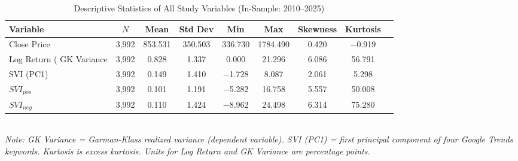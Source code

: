 \begin{table}[H]
\centering
\caption{Descriptive Statistics of All Study Variables (In-Sample: 2010--2025)}
\label{tab:descriptive}
\small
\begin{tabular}{lcccccccc}
\toprule
Variable & $N$ & Mean & Std Dev & Min & Max & Skewness & Kurtosis \\
\midrule
        Close Price & 3,992 & 853.531 & 350.503 & 336.730 & 1784.490 & 0.420 & $-$0.919 \\
        Log Return (%
        GK Variance & 3,992 & 0.828 & 1.337 & 0.000 & 21.296 & 6.086 & 56.791 \\
        SVI (PC1) & 3,992 & 0.149 & 1.410 & $-$1.728 & 8.087 & 2.061 & 5.298 \\
        $SVI_{pos}$ & 3,992 & 0.101 & 1.191 & $-$5.282 & 16.758 & 5.557 & 50.008 \\
        $SVI_{neg}$ & 3,992 & 0.110 & 1.424 & $-$8.962 & 24.498 & 6.314 & 75.280 \\
\bottomrule
\end{tabular}
\smallskip\\
\footnotesize\textit{Note: GK Variance = Garman-Klass realized variance (dependent variable). SVI (PC1) = first principal component of four Google Trends keywords. Kurtosis is excess kurtosis. Units for Log Return and GK Variance are percentage points.}
\end{table}